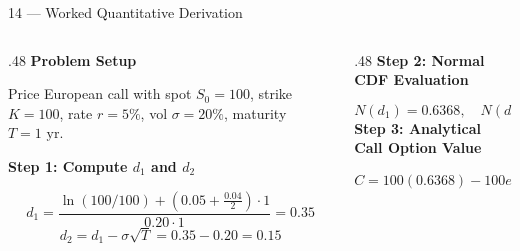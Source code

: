 \documentclass[aspectratio=169,10pt]{beamer}
\begin{document}
\begin{frame}{14 — Worked Quantitative Derivation}
  \begin{columns}[T,onlytextwidth]
    \begin{column}{.48\textwidth}
      {\small\bfseries\color{BayesInk}Problem Setup}\par\BayesSmallGap
      {\small Price European call with spot $S_0 = 100$, strike $K = 100$, rate $r = 5\%$, vol $\sigma = 20\%$, maturity $T = 1\text{ yr}$.}\par\BayesGap
      {\small\bfseries\color{BayesTeal}Step 1: Compute $d_1$ and $d_2$}\par\BayesGap
      \[
        d_1 = \frac{\ln(100/100) + (0.05 + \frac{0.04}{2})\cdot 1}{0.20 \cdot 1} = 0.35
      \]
      \BayesSmallGap
      \[
        d_2 = d_1 - \sigma\sqrt{T} = 0.35 - 0.20 = 0.15
      \]
    \end{column}
    \hfill
    \begin{column}{.48\textwidth}
      {\small\bfseries\color{BayesTeal}Step 2: Normal CDF Evaluation}\par\BayesGap
      \[
        N(d_1) = 0.6368, \quad N(d_2) = 0.5596
      \]
      \BayesGap
      {\small\bfseries\color{BayesDark}Step 3: Analytical Call Option Value}\par\BayesGap
      \[
        C = 100(0.6368) - 100e^{-0.05}(0.5596) = \mathbf{\$10.45}
      \]
      \BayesGap
    \end{column}
  \end{columns}
  \vfill
\end{frame}
\end{document}

